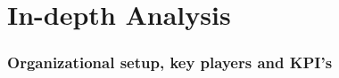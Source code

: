 \part{In-depth Analysis}
\label{prt:in_depth_analysis}


\section{Organizational setup, key players and KPI's}




